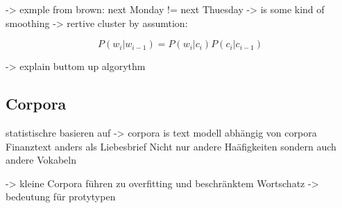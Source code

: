     	-> exmple from brown: next Monday != next Thuesday
        -> is some kind of smoothing
        -> rertive cluster by assumtion:
    
    	\begin{equation}
   			P(w_i|w_{i-1}) = P(w_i|c_i) P(c_i|c_{i-1})
        	\label{eq:wordPropability}
		\end{equation}
        
        -> explain buttom up algorythm
        
    \newpage    
    \subsection{Corpora}
    	statistischre basieren auf -> corpora is text
        modell abhängig von corpora
    	Finanztext anders als Liebesbrief
        Nicht nur andere Haäfigkeiten sondern auch andere Vokabeln 
        
        -> kleine Corpora führen zu overfitting und beschränktem Wortschatz
        -> bedeutung für protytypen
    \newpage
    
